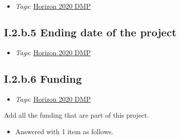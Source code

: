 \documentclass[a4paper,12pt]{report}
\begin{document}
\begin{itemize}
  \item \textit{Tags}: \ul{Horizon 2020 DMP}
  \end{itemize}





\subsection*{\protect\textcolor{colorSecId}{I.2.b.5} Ending date of the project}

\label{1e85da40-bbfc-4180-903e-6c569ed2da38.c3dabaaf-c946-4a0d-889c-ede966f97667.afc53854-30c4-4236-a5be-7e49ad186b95.cabc6f07-6015-454e-b97a-c34db4ec0c60}


\begin{itemize}
  \item \textit{Tags}: \ul{Horizon 2020 DMP}
  \end{itemize}





\subsection*{\protect\textcolor{colorSecId}{I.2.b.6} Funding}

\label{1e85da40-bbfc-4180-903e-6c569ed2da38.c3dabaaf-c946-4a0d-889c-ede966f97667.afc53854-30c4-4236-a5be-7e49ad186b95.36a87eac-402d-43fb-a0df-ac5963bdf87d}


\begin{itemize}
  \item \textit{Tags}: \ul{Horizon 2020 DMP}
  \end{itemize}


\noindent
\begin{markdown}
Add all the funding that are part of this project.
\end{markdown}


\begin{itemize}
  \item[\ArrowBoldDownRight] Answered with 1 item as follows.
\end{itemize}%
\end{document}
